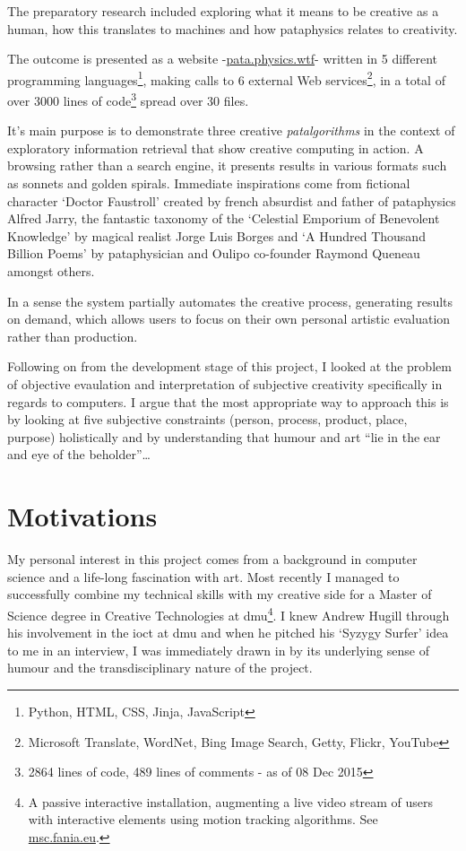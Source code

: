 The preparatory research included exploring what it means to be creative as a human, how this translates to machines and how pataphysics relates to creativity.

The outcome is presented as a website -\url{pata.physics.wtf}- written in 5 different programming languages\footnote{Python, HTML, CSS, Jinja, JavaScript}, making calls to 6 external Web services\footnote{Microsoft Translate, WordNet, Bing Image Search, Getty, Flickr, YouTube}, in a total of over 3000 lines of code\footnote{2864 lines of code, 489 lines of comments - as of 08 Dec 2015} spread over 30 files.

It's main purpose is to demonstrate three creative \textit{patalgorithms} in the context of exploratory information retrieval that show creative computing in action. A browsing rather than a search engine, it presents results in various formats such as sonnets and golden spirals. Immediate inspirations come from fictional character `Doctor Faustroll' created by french absurdist and father of pataphysics Alfred Jarry, the fantastic taxonomy of the `Celestial Emporium of Benevolent Knowledge' by magical realist Jorge Luis Borges and `A Hundred Thousand Billion Poems' by pataphysician and Oulipo co-founder Raymond Queneau amongst others.

In a sense the system partially automates the creative process, generating results on demand, which allows users to focus on their own personal artistic evaluation rather than production.


Following on from the development stage of this project, I looked at the problem of objective evaulation and interpretation of subjective creativity specifically in regards to computers. I argue that the most appropriate way to approach this is by looking at five subjective constraints (person, process, product, place, purpose) holistically and by understanding that humour and art ``lie in the ear and eye of the beholder''\ldots


\section{Motivations}

My personal interest in this project comes from a background in computer science and a life-long fascination with art. Most recently I managed to successfully combine my technical skills with my creative side for a Master of Science degree in Creative Technologies at \gls{dmu}\footnote{A passive interactive installation, augmenting a live video stream of users with interactive elements using motion tracking algorithms. See \url{msc.fania.eu}.}. I knew Andrew Hugill through his involvement in the \gls{ioct} at \gls{dmu} and when he pitched his `Syzygy Surfer' \autocite{Hendler2011, Hendler2013} idea to me in an interview, I was immediately drawn in by its underlying sense of humour and the transdisciplinary nature of the project.

